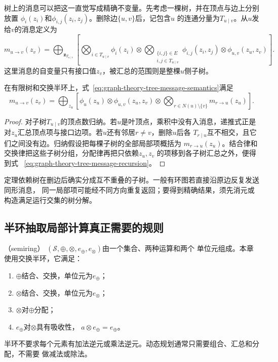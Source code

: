 树上的消息可以把这一直觉写成精确不变量。先考虑一棵树，并在顶点与边上分别放置
\(\phi_i(z_i)\)和\(\phi_{i,j}(z_i,z_j)\)。删除边\(\{u,v\}\)后，记包含\(u\)
的连通分量为\(T_{u\mid v}\)。从\(u\)发给\(v\)的消息定义为
\begin{equation}
  m_{u\to v}(z_v)=
  \bigoplus_{\bm{z}_{T_{u\mid v}}}
  \left[
    \bigotimes_{i\in T_{u\mid v}}\phi_i(z_i)
    \otimes
    \bigotimes_{\substack{\{i,j\}\in E\\i,j\in T_{u\mid v}}}
      \phi_{i,j}(z_i,z_j)
    \otimes\phi_{u,v}(z_u,z_v)
  \right].
  \label{eq:graph-theory-tree-message-semantics}
\end{equation}
这里消息的自变量只有接口值\(z_v\)，被汇总的范围则是整棵\(u\)侧子树。

\begin{theorem}[树消息递推]
  \label{thm:graph-theory-tree-message-recursion}
  在有限树和交换半环上，式~\eqref{eq:graph-theory-tree-message-semantics}满足
  \begin{equation}
    m_{u\to v}(z_v)=
    \bigoplus_{z_u}
    \left[
      \phi_u(z_u)\otimes\phi_{u,v}(z_u,z_v)
      \otimes
      \bigotimes_{r\in N(u)\setminus\{v\}}m_{r\to u}(z_u)
    \right].
    \label{eq:graph-theory-tree-message-recursion}
  \end{equation}
\end{theorem}

\begin{proof}
对子树\(T_{u\mid v}\)的顶点数归纳。若\(u\)是叶顶点，乘积中没有入消息，递推式正是
对\(z_u\)汇总顶点项与接口边项。若\(u\)还有邻居\(r\neq v\)，删除\(u\)后各
\(T_{r\mid u}\)互不相交，且它们之间没有边。归纳假设把每棵子树的全部局部项概括为
\(m_{r\to u}(z_u)\)。结合律和交换律把这些子树分组，分配律再把只依赖\(z_u,z_v\)
的项移到各子树汇总之外，便得到式
~\eqref{eq:graph-theory-tree-message-recursion}。
\end{proof}

定理依赖树在删边后确实分成互不重叠的子树。一般有环图若直接沿原边反复发送同形消息，
同一局部项可能经不同方向重复返回；要得到精确结果，须先消元或构造满足运行交集的树分解。

\subsection{半环抽取局部计算真正需要的规则}

（semiring）
\((\mathcal{S},\oplus,\otimes,e_{\oplus},e_{\otimes})\)由一个集合、两种运算和两个
单位元组成。本章使用交换半环，它满足：
\begin{enumerate}
  \item \(\oplus\)结合、交换，单位元为\(e_{\oplus}\)；
  \item \(\otimes\)结合、交换，单位元为\(e_{\otimes}\)；
  \item \(\otimes\)对\(\oplus\)分配；
  \item \(e_{\oplus}\)对\(\otimes\)具有吸收性，
    \(a\otimes e_{\oplus}=e_{\oplus}\)。
\end{enumerate}
半环不要求每个元素有加法逆元或乘法逆元。动态规划通常只需要组合、汇总和分配，不需要
做减法或除法。

